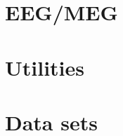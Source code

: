 \documentclass[a4paper,titlepage]{book}
\begin{document}
\part{EEG/MEG}









\part{Utilities}




%



%
%
%

%



%
%


\part{Data sets}









\end{document}
